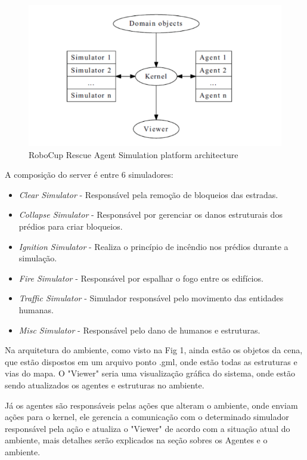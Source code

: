 \documentclass[conference]{IEEEtran}
\begin{document}
\begin{figure}[htbp]
\centerline{\includegraphics[scale=0.3]{fig1.png}}
\caption{RoboCup Rescue Agent Simulation platform architecture \cite{b1}}
\label{fig}
\end{figure}

A composição do server é entre 6 simuladores:
\begin{itemize}
\item \textit {Clear Simulator} - Responsável pela remoção de bloqueios das estradas. 
\item \textit {Collapse Simulator} - Responsável por gerenciar os danos estruturais dos prédios para criar bloqueios.
\item \textit {Ignition Simulator} - Realiza o princípio de incêndio nos prédios durante a simulação.
\item \textit {Fire Simulator} - Responsável por espalhar o fogo entre os edifícios.
\item \textit {Traffic Simulator} - Simulador responsável pelo movimento das entidades humanas.
\item \textit {Misc Simulator} - Responsável pelo dano de humanos e estruturas.
\end{itemize}

Na arquitetura do ambiente, como visto na Fig 1, ainda estão os objetos da cena, que estão dispostos em um arquivo ponto .gml, onde estão todas as estruturas e vias do mapa. O "Viewer" seria uma visualização gráfica do sistema, onde estão sendo atualizados os agentes e estruturas no ambiente. 

Já os agentes são responsáveis pelas ações que alteram o ambiente, onde enviam ações para o kernel, ele gerencia a comunicação com o determinado simulador responsável pela ação e atualiza o "Viewer" de acordo com a situação atual do ambiente, mais detalhes serão explicados na seção sobres os Agentes e o ambiente.
\end{document}
